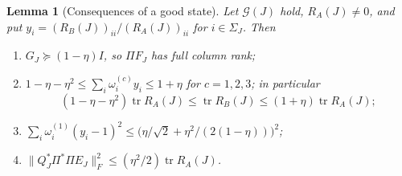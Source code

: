\documentclass[11pt]{article}
\newtheorem{lemma}[theorem]{Lemma}
\theoremstyle{definition}\newtheorem{definition}[theorem]{Definition}
\theoremstyle{remark}\newtheorem{remark}[theorem]{Remark}
\newcommand{\tr}{\operatorname{tr}}
\newcommand{\calG}{\mathcal G}
\newcommand{\1}{\mathbf 1}
\begin{document}
\begin{lemma}[Consequences of a good state]\label{lem:good}
Let $\calG(J)$ hold, $R_A(J)\ne0$, and put
$y_i=(R_B(J))_{ii}/(R_A(J))_{ii}$ for $i\in\Sigma_J$. Then
\begin{enumerate}[label=\textup{(\alph*)}]
\item $G_J\succeq(1-\eta)I$, so $\Pi F_J$ has full column rank;
\item $1-\eta-\eta^2\le\sum_i\omega^{(c)}_iy_i\le1+\eta$ for $c=1,2,3$; in
 particular
 \begin{equation}\label{eq:trace-comparison}
  (1-\eta-\eta^2)\tr R_A(J)\le\tr R_B(J)\le(1+\eta)\tr R_A(J);
 \end{equation}
\item $\sum_i\omega^{(1)}_i(y_i-1)^2
 \le\bigl(\eta/\sqrt2+\eta^2/(2(1-\eta))\bigr)^2$;
\item $\|Q_J^*\Pi^*\Pi E_J\|_F^2\le(\eta^2/2)\tr R_A(J)$.
\end{enumerate}
\end{lemma}
\end{document}
